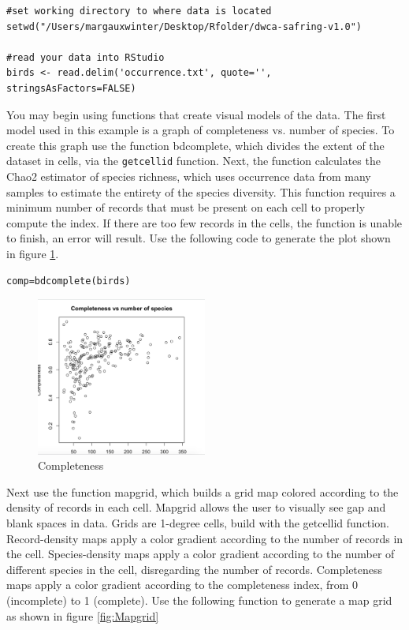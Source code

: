 \begin{lstlisting}[morekeywords = {delim,stringsAsFactors}]
#set working directory to where data is located
setwd("/Users/margauxwinter/Desktop/Rfolder/dwca-safring-v1.0")

#read your data into RStudio
birds <- read.delim('occurrence.txt', quote='', stringsAsFactors=FALSE)
\end{lstlisting}

You may begin using functions that create visual models of the data.
The first model used in this example is a graph of completeness vs. number of species.
To create this graph use the function bdcomplete, which divides the extent of the dataset in cells, via the \texttt{getcellid} function.
Next, the function calculates the Chao2 estimator of species richness, which uses occurrence data from many samples to estimate the entirety of the species diversity.
This function requires a minimum number of records that must be present on each cell to properly compute the index.
If there are too few records in the cells, the function is unable to finish, an error will result.
Use the following code to generate the plot shown in figure \ref{fig:completeness}.

\begin{lstlisting}[morekeywords={bdcomplete}]
comp=bdcomplete(birds)
\end{lstlisting}

\begin{figure}[htbp!]
   \centering
   \includegraphics[width=0.5\textwidth]{pictures/biodiversity/complete.jpg} 
      \caption{Completeness}
   \label{fig:completeness}
\end{figure} 

Next use the function mapgrid, which builds a grid map colored according to the density of records in each cell.
Mapgrid allows the user to visually see gap and blank spaces in data.
Grids are 1-degree cells, build with the getcellid function.
Record-density maps apply a color gradient according to the number of records in the cell.
Species-density maps apply a color gradient according to the number of different species in the cell, disregarding the number of records.
Completeness maps apply a color gradient according to the completeness index, from 0 (incomplete) to 1 (complete).
Use the following function to generate a map grid as shown in figure \ref{fig:Mapgrid}

